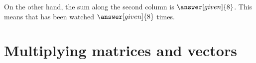 \documentclass{ximera}
\begin{document}
\begin{example}
\begin{explanation}
    On the other hand, the sum along the second column is $\answer[given]{8}$. This
    means that  has been watched $\answer[given]{8}$ times.
  \end{explanation}
\end{example}





\section{Multiplying matrices and vectors}


\end{document}
